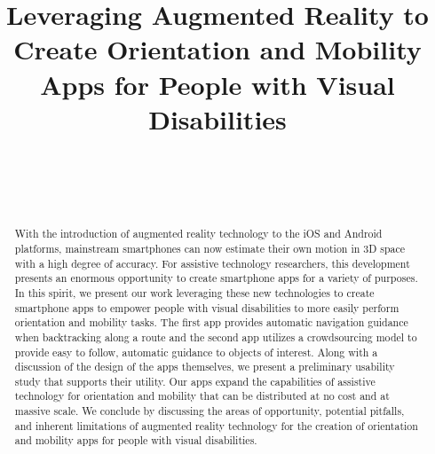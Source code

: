 \documentclass[chi_draft]{sigchi}
\def\plaintitle{Leveraging Augmented Reality to Create Orientation and Mobility Apps for People with Visual Disabilities}
\begin{document}
\title{\plaintitle}

\author{%
  \\
  \\
  \\
}

\maketitle

\begin{abstract}
With the introduction of augmented reality technology to the iOS and Android platforms, mainstream smartphones can now estimate their own motion in 3D space with a high degree of accuracy.  For assistive technology researchers, this development presents an enormous opportunity to create smartphone apps for a variety of purposes.  In this spirit, we present our work leveraging these new technologies to create smartphone apps to empower people with visual disabilities to more easily perform orientation and mobility tasks.  The first app provides automatic navigation guidance when backtracking along a route and the second app utilizes a crowdsourcing model to provide easy to follow, automatic guidance to objects of interest.  Along with a discussion of the design of the apps themselves, we present a preliminary usability study that supports their utility.  Our apps expand the capabilities of assistive technology for orientation and mobility that can be distributed at no cost and at massive scale.  We conclude by discussing the areas of opportunity, potential pitfalls, and inherent limitations of augmented reality technology for the creation of orientation and mobility apps for people with visual disabilities.
\end{abstract}
\end{document}
